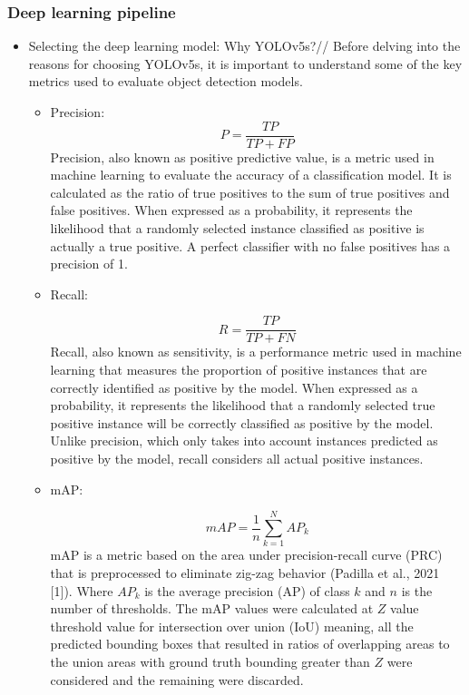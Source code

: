 \subsubsection{Deep learning pipeline}
\begin{itemize}
\item{Selecting the deep learning model: Why YOLOv5s?}//
Before delving into the reasons for choosing YOLOv5s, it is important to understand some of the key metrics used to evaluate object detection models. 
\begin{itemize}
\item Precision:
\begin{equation}
P = \frac{TP}{TP+FP}
\end{equation}
Precision, also known as positive predictive value, is a metric used in machine learning to evaluate the accuracy of a classification model. It is calculated as the ratio of true positives to the sum of true positives and false positives. When expressed as a probability, it represents the likelihood that a randomly selected instance classified as positive is actually a true positive. A perfect classifier with no false positives has a precision of 1.\cite{KGMM21}

\item Recall:

\begin{equation}
R = \frac{TP}{TP+FN}
\end{equation}
Recall, also known as sensitivity, is a performance metric used in machine learning that measures the proportion of positive instances that are correctly identified as positive by the model. When expressed as a probability, it represents the likelihood that a randomly selected true positive instance will be correctly classified as positive by the model. Unlike precision, which only takes into account instances predicted as positive by the model, recall considers all actual positive instances.\cite{KGMM21}

\item mAP:

\begin{equation}
mAP = \frac{1}{n} \sum_{k=1}^{N} AP_k
\end{equation}
mAP is a metric based on the area under precision-recall curve (PRC) that is preprocessed to eliminate zig-zag behavior (Padilla et al., 2021 [1]). Where $AP_k$ is the average precision (AP) of class $k$ and $n$ is the number of thresholds. The mAP values were calculated at $Z$ value threshold value for intersection over union (IoU) meaning, all the predicted bounding boxes that resulted in ratios of overlapping areas to the union areas with ground truth bounding greater than $Z$ were considered and the remaining were discarded.\cite{MG21}


\end{itemize}
\end{itemize}
